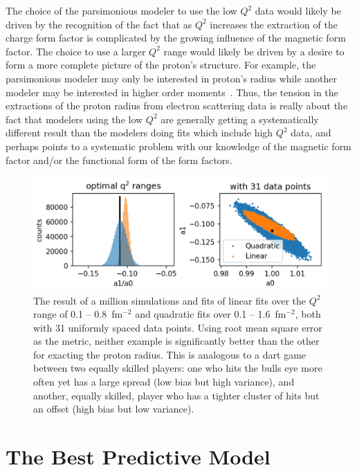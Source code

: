 \documentclass[10pt,superscriptaddress,aps,prc,twocolumn]{revtex4-1}
\begin{document}
The choice of the parsimonious modeler to use the low $Q^2$ data would likely be 
driven by the recognition of the fact that as $Q^2$ increases
the extraction of the charge form factor is complicated by the growing influence of the magnetic 
form factor.   The choice to use a larger $Q^2$ range would likely be driven by a desire 
to form a more complete picture of the proton's structure.
For example, the parsimonious modeler may only be interested in proton's radius while another 
modeler may be interested in higher order moments~\cite{Alarcon:2017lhg}.
Thus, the tension in the extractions of the proton radius from electron scattering data is really 
about the fact that modelers using the low $Q^2$ are generally getting a systematically different 
result than the modelers doing fits which include high $Q^2$ data, and perhaps points to a systematic 
problem with our knowledge of the magnetic form factor and/or the functional form of the
form factors.

\begin{figure}
\includegraphics[width=\columnwidth]{Figure/zoptimized.png}
\caption{The result of a million simulations and fits of linear fits over the $Q^2$ range 
of 0.1 -- 0.8~fm$^{-2}$ and quadratic fits over 0.1 -- 1.6~fm$^{-2}$, both with 31 uniformly 
spaced data points.    Using root mean
square error as the metric, neither example is significantly better than the other for exacting the proton
radius.   This is analogous to a dart game between two equally skilled players: one who hits the bulls eye more 
often yet has a large spread (low bias but high variance), and another, equally skilled, player who has a 
tighter cluster of hits but an offset (high bias but low variance).}
\label{zoptimized}
\end{figure}

\section{The Best Predictive Model}
\end{document}
